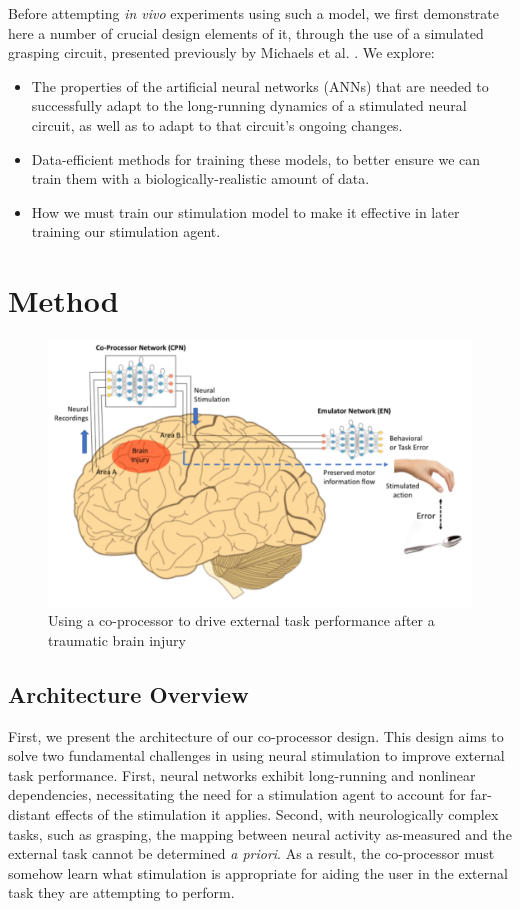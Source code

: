 \documentclass[12pt]{iopart}
\begin{document}
Before attempting \textit{in vivo} experiments using such a model, we first demonstrate
here a number of crucial design elements of it, through the use of a simulated
grasping circuit, presented previously by Michaels et al. \cite{michaels.mrnn}. We
explore:
\begin{itemize}
	\item The properties of the artificial neural networks (ANNs) that are needed to
	      successfully adapt to the long-running dynamics of a stimulated neural circuit,
	      as well as to adapt to that circuit's ongoing changes.
	\item Data-efficient methods for training these models, to better ensure we
	      can train them with a biologically-realistic amount of data.
	\item How we must train our stimulation model to make it effective in later
	      training our stimulation agent.
\end{itemize}

\section{Method}

\begin{figure}
\includegraphics[width=\textwidth]{weill_arch.png}
\caption{Using a co-processor to drive external task performance after a traumatic brain injury}
\centering
\label{fig:weill}
\end{figure}

\subsection{Architecture Overview}
First, we present the architecture of our co-processor design. This design aims to solve two
fundamental challenges in using neural stimulation to improve external task performance.
First, neural networks exhibit long-running and nonlinear dependencies, necessitating
the need for a stimulation agent to account for far-distant effects of the stimulation it
applies. Second, with neurologically complex tasks, such as grasping, the mapping between
neural activity as-measured and the external task cannot be determined \textit{a priori}.
As a result, the co-processor must somehow learn what stimulation is appropriate for
aiding the user in the external task they are attempting to perform.
\end{document}
